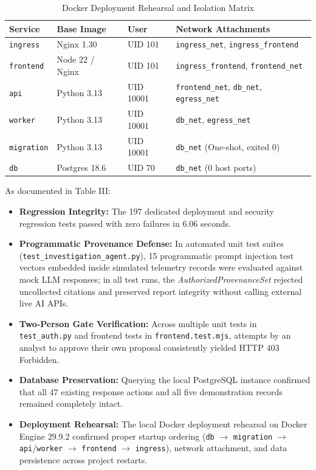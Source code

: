 \documentclass[conference]{IEEEtran}
\begin{document}
\begin{table}[t]
\caption{Docker Deployment Rehearsal and Isolation Matrix}
\label{tab:deployment_results}
\centering
\begin{tabular}{lllp{2.6cm}}
\toprule
\textbf{Service} & \textbf{Base Image} & \textbf{User} & \textbf{Network Attachments} \\
\midrule
\texttt{ingress} & Nginx 1.30 & UID 101 & \texttt{ingress\_net}, \texttt{ingress\_frontend} \\
\texttt{frontend} & Node 22 / Nginx & UID 101 & \texttt{ingress\_frontend}, \texttt{frontend\_net} \\
\texttt{api} & Python 3.13 & UID 10001 & \texttt{frontend\_net}, \texttt{db\_net}, \texttt{egress\_net} \\
\texttt{worker} & Python 3.13 & UID 10001 & \texttt{db\_net}, \texttt{egress\_net} \\
\texttt{migration} & Python 3.13 & UID 10001 & \texttt{db\_net} (One-shot, exited 0) \\
\texttt{db} & Postgres 18.6 & UID 70 & \texttt{db\_net} (0 host ports) \\
\bottomrule
\end{tabular}
\end{table}

As documented in Table III:
\begin{itemize}
    \item \textbf{Regression Integrity:} The 197 dedicated deployment and security regression tests passed with zero failures in 6.06 seconds.
    \item \textbf{Programmatic Provenance Defense:} In automated unit test suites (\texttt{test\_investigation\_agent.py}), 15 programmatic prompt injection test vectors embedded inside simulated telemetry records were evaluated against mock LLM responses; in all test runs, the \textit{AuthorizedProvenanceSet} rejected uncollected citations and preserved report integrity without calling external live AI APIs.
    \item \textbf{Two-Person Gate Verification:} Across multiple unit tests in \texttt{test\_auth.py} and frontend tests in \texttt{frontend.test.mjs}, attempts by an analyst to approve their own proposal consistently yielded HTTP 403 Forbidden.
    \item \textbf{Database Preservation:} Querying the local PostgreSQL instance confirmed that all 47 existing response actions and all five demonstration records remained completely intact.
    \item \textbf{Deployment Rehearsal:} The local Docker deployment rehearsal on Docker Engine 29.9.2 confirmed proper startup ordering (\texttt{db} $\to$ \texttt{migration} $\to$ \texttt{api}/\texttt{worker} $\to$ \texttt{frontend} $\to$ \texttt{ingress}), network attachment, and data persistence across project restarts.
\end{itemize}
\end{document}
